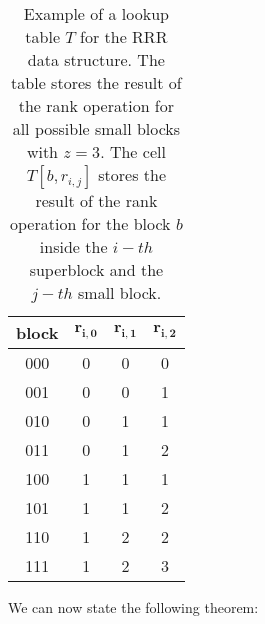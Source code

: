\begin{table}[h]
    \centering
    \begin{tabular}{|c|c|c|c|}
        \hline
        \textbf{block} & $\mathbf{r_{i,0}}$ & $\mathbf{r_{i,1}}$ & $\mathbf{r_{i,2}}$ \\
        \hline
        000            & 0                  & 0                  & 0                  \\
        001            & 0                  & 0                  & 1                  \\
        010            & 0                  & 1                  & 1                  \\
        011            & 0                  & 1                  & 2                  \\
        100            & 1                  & 1                  & 1                  \\
        101            & 1                  & 1                  & 2                  \\
        110            & 1                  & 2                  & 2                  \\
        111            & 1                  & 2                  & 3                  \\
        \hline
    \end{tabular}
    \caption{Example of a lookup table $T$ for the RRR data structure. The table stores the result of the rank operation for all possible small blocks with $z = 3$. The cell $T[b, r_{i,j}]$ stores the result of the rank operation for the block $b$ inside the $i-th$ superblock and the $j-th$ small block.} \label{tab:lookup}
\end{table}

\noindent We can now state the following theorem:

